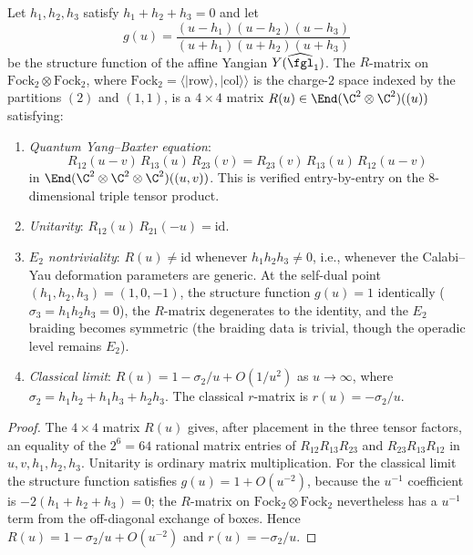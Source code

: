 \begin{theorem}
\label{thm:yang-r-matrix-ybe}
Let $h_1, h_2, h_3$ satisfy $h_1 + h_2 + h_3 = 0$ and let
\[
 g(u) = \frac{(u - h_1)(u - h_2)(u - h_3)}{(u + h_1)(u + h_2)(u + h_3)}
\]
be the structure function of the affine Yangian $Y(\widehat{\fgl}_1)$.
The \(R\)-matrix on
\(\mathrm{Fock}_2 \otimes \mathrm{Fock}_2\), where
\(\mathrm{Fock}_2=\langle |\mathrm{row}\rangle,|\mathrm{col}\rangle\rangle\)
is the charge-$2$ space indexed by the partitions \((2)\) and
\((1,1)\), is a \(4\times4\) matrix
\(R(u) \in \End(\C^2 \otimes \C^2)((u))\) satisfying:
\begin{enumerate}[label=(\roman*)]
 \item \emph{Quantum Yang--Baxter equation}:
 \[
 R_{12}(u-v)\, R_{13}(u)\, R_{23}(v) = R_{23}(v)\, R_{13}(u)\, R_{12}(u-v)
 \]
 in $\End(\C^2 \otimes \C^2 \otimes \C^2)((u,v))$. This is verified
 entry-by-entry on the \(8\)-dimensional triple tensor product.
 \item \emph{Unitarity}: $R_{12}(u)\, R_{21}(-u) = \mathrm{id}$.
 \item \emph{$E_2$ nontriviality}: $R(u) \neq \mathrm{id}$ whenever $h_1 h_2 h_3 \neq 0$, i.e., whenever the Calabi--Yau deformation parameters are generic. At the self-dual point $(h_1, h_2, h_3) = (1, 0, -1)$, the structure function $g(u) = 1$ identically ($\sigma_3 = h_1 h_2 h_3 = 0$), the $R$-matrix degenerates to the identity, and the $E_2$ braiding becomes symmetric (the braiding data is trivial, though the operadic level remains $E_2$).
 \item \emph{Classical limit}: $R(u) = 1 - \sigma_2/u + O(1/u^2)$ as $u \to \infty$, where $\sigma_2 = h_1 h_2 + h_1 h_3 + h_2 h_3$. The classical $r$-matrix is $r(u) = -\sigma_2/u$.
\end{enumerate}
\end{theorem}

\begin{proof}
The \(4\times4\) matrix \(R(u)\) gives, after placement in the three
tensor factors, an equality of the \(2^6 = 64\) rational matrix entries of
$R_{12}R_{13}R_{23}$ and $R_{23}R_{13}R_{12}$ in
$u,v,h_1,h_2,h_3$.  Unitarity is ordinary matrix multiplication.  For
the classical limit the structure function satisfies
$g(u) = 1 + O(u^{-2})$, because the $u^{-1}$ coefficient is
$-2(h_1+h_2+h_3)=0$; the $R$-matrix on
$\mathrm{Fock}_2\otimes \mathrm{Fock}_2$ nevertheless has a $u^{-1}$
term from the off-diagonal exchange of boxes.  Hence
$R(u)=1-\sigma_2/u+O(u^{-2})$ and $r(u)=-\sigma_2/u$.
\end{proof}


